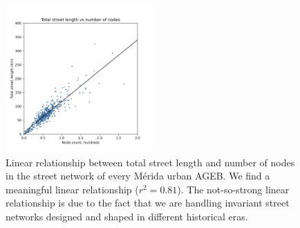 \begin{figure}[htpb]
  \centering
  \includegraphics[width=0.5\textwidth]{Figures/merida-ageb-street-length-vs-nodes.png}
  \caption{Linear relationship between total street length and number of nodes in the street network of every Mérida urban AGEB. We find a meaningful linear relationship ($r^2 = 0.81$). The not-so-strong linear relationship is due to the fact that we are handling invariant street networks designed and shaped in different historical eras.
    \label{fig:merida-ageb-street-length-vs-nodes}}
\end{figure}

